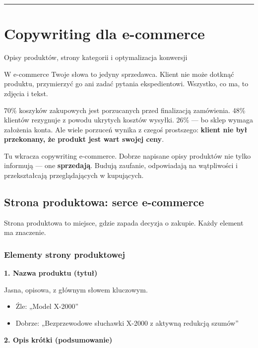 \documentclass[
  12pt,
  a4paper,
  twoside,
  openright,
  12pt,
  DIV=12,
  BCOR=12mm]{scrbook}
\providecommand{\tightlist}{%
  \setlength{\itemsep}{0pt}\setlength{\parskip}{0pt}}\usepackage{longtable,booktabs,array}
\newcommand{\decoline}{%
  \begin{center}
    \textcolor{bordergray}{\rule{0.3\textwidth}{0.5pt}}
  \end{center}
}
\begin{document}
\decoline


\chapter{Copywriting dla e-commerce}\label{copywriting-dla-e-commerce}

Opisy produktów, strony kategorii i optymalizacja konwersji

\hfill\break

W e-commerce Twoje słowa to jedyny sprzedawca. Klient nie może dotknąć
produktu, przymierzyć go ani zadać pytania ekspedientowi. Wszystko, co
ma, to zdjęcia i tekst.

70\% koszyków zakupowych jest porzucanych przed finalizacją zamówienia.
48\% klientów rezygnuje z powodu ukrytych kosztów wysyłki. 26\% --- bo
sklep wymaga założenia konta. Ale wiele porzuceń wynika z czegoś
prostszego: \textbf{klient nie był przekonany, że produkt jest wart
swojej ceny}.

Tu wkracza copywriting e-commerce. Dobrze napisane opisy produktów nie
tylko informują --- one \textbf{sprzedają}. Budują zaufanie, odpowiadają
na wątpliwości i przekształcają przeglądających w kupujących.

\section{Strona produktowa: serce
e-commerce}\label{strona-produktowa-serce-e-commerce}

Strona produktowa to miejsce, gdzie zapada decyzja o zakupie. Każdy
element ma znaczenie.

\subsection{Elementy strony
produktowej}\label{elementy-strony-produktowej}

\textbf{1. Nazwa produktu (tytuł)}

Jasna, opisowa, z głównym słowem kluczowym.

\begin{itemize}
\tightlist
\item
  Źle: „Model X-2000''
\item
  Dobrze: „Bezprzewodowe słuchawki X-2000 z aktywną redukcją szumów''
\end{itemize}

\textbf{2. Opis krótki (podsumowanie)}
\end{document}
